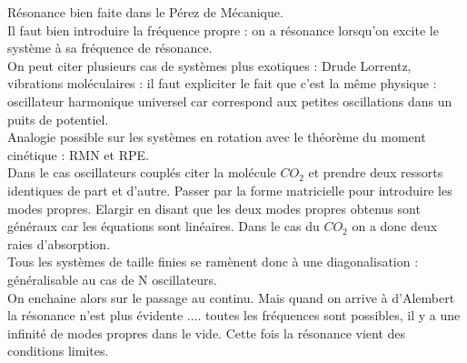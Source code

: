 \documentclass[12pt,prb,aps,epsf]{article}
\begin{document}
Résonance bien faite dans le Pérez de Mécanique.\\

Il faut bien introduire la fréquence propre : on a résonance lorsqu'on excite le système à sa fréquence de résonance.\\

On peut citer plusieurs cas de systèmes plus exotiques : Drude Lorrentz, vibrations moléculaires : il faut expliciter le fait que c'est la même physique : oscillateur harmonique universel car correspond aux petites oscillations dans un puits de potentiel.\\

Analogie possible sur les systèmes en rotation avec le théorème du moment cinétique : RMN et RPE.\\

Dans le cas oscillateurs couplés citer la molécule $CO_2$ et prendre deux ressorts identiques de part et d'autre. Passer par la forme matricielle pour introduire les modes propres. Elargir en disant que les deux modes propres obtenus sont généraux car les équations sont linéaires. Dans le cas du $CO_2$ on a donc deux raies d'absorption.\\
Tous les systèmes de taille finies se ramènent donc à une diagonalisation : généralisable au cas de N oscillateurs.\\
On enchaine alors sur le passage au continu. Mais quand on arrive à d'Alembert la résonance n'est plus évidente .... toutes les fréquences sont possibles, il y a une infinité de modes propres dans le vide. Cette fois la résonance vient des conditions limites.\\
\end{document}
